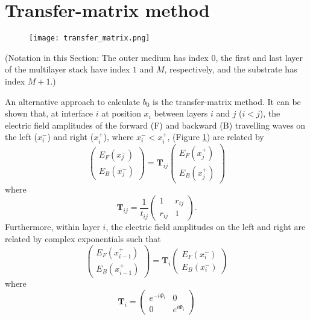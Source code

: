 \documentclass[]{article}
\begin{document}
	\section{Transfer-matrix method}
	\begin{figure}[H]
		\centering
		\texttt{[image: transfer\_matrix.png]}
		\caption{}
		\label{fig:transfer-matrices}
	\end{figure}

	{\small (Notation in this Section: The outer medium has index $0$, the first and last layer of the multilayer stack have index $1$ and $M$, respectively, and the substrate has index $M+1$.)}
	
	An alternative approach to calculate $b_0$ is the transfer-matrix method. It can be shown that, at interface $i$ at position $x_i$ between layers $i$ and $j$ ($i<j$), the electric field amplitudes of the forward (F) and backward (B) travelling waves on the left ($x_i^-$) and right ($x_i^+$), where $x_i^-<x_i^+$, (Figure \ref{fig:transfer-matrices}) are related by
	\begin{equation}
		\begin{pmatrix}
			E_F(x_j^-)\\
			E_B(x_j^-)
		\end{pmatrix}=
		\mathbf{T}_{ij}
		\begin{pmatrix}
			E_F(x_j^+)\\
			E_B(x_j^+)
		\end{pmatrix}
	\end{equation} 
	where 
	\begin{equation}
		\mathbf{T}_{ij}=
		\frac{1}{t_{ij}}
		\begin{pmatrix}
			1&r_{ij}\\
			r_{ij}&1
		\end{pmatrix}.
	\end{equation}
	Furthermore, within layer $i$, the electric field amplitudes on the left and right are related by complex exponentials such that
	\begin{equation}
		\begin{pmatrix}
			E_F(x_{i-1}^+)\\
			E_B(x_{i-1}^+)
		\end{pmatrix}=
		\mathbf{T}_i
		\begin{pmatrix}
			E_F(x_i^-)\\
			E_B(x_i^-)
		\end{pmatrix}
	\end{equation}
	where 
	\begin{equation}
		\mathbf{T}_i=
		\begin{pmatrix}
			e^{-i\Phi_i}&0\\
			0&e^{i\Phi_i}
		\end{pmatrix}
	\end{equation}
\end{document}
